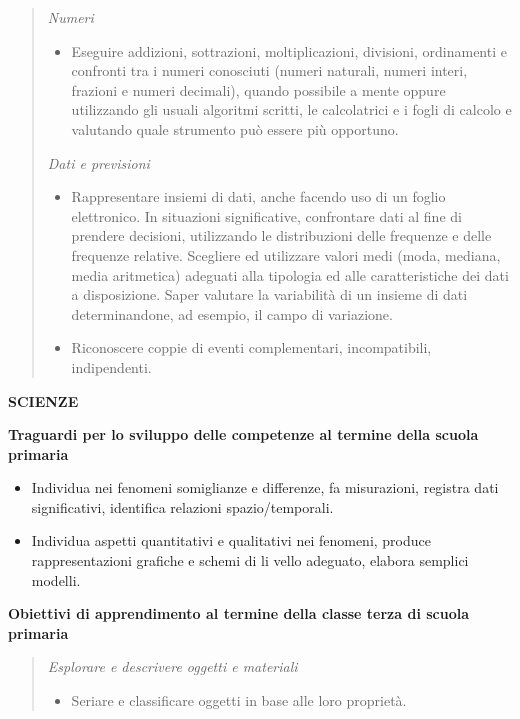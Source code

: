 \documentclass[12pt]{report}
\begin{document}
\begin{quote}
\medskip
\textit{Numeri}

\begin{itemize}
\item Eseguire addizioni, sottrazioni, moltiplicazioni, divisioni, ordinamenti e confronti tra i numeri conosciuti (numeri naturali, numeri interi, frazioni e numeri decimali), quando possibile a mente oppure utilizzando gli usuali algoritmi scritti, le calcolatrici e i fogli di calcolo e valutando quale strumento può essere più opportuno.
\end{itemize}

\medskip
\textit{Dati e previsioni}

\begin{itemize}
\item Rappresentare insiemi di dati, anche facendo uso di un foglio elettronico. In situazioni significative, confrontare dati al fine di prendere decisioni, utilizzando le distribuzioni delle frequenze e delle frequenze relative. Scegliere ed utilizzare valori medi (moda, mediana, media aritmetica) adeguati alla tipologia ed alle caratteristiche dei dati a disposizione. Saper valutare la variabilità di un insieme di dati determinandone, ad esempio, il campo di variazione.

\item Riconoscere coppie di eventi complementari, incompatibili, indipendenti.
\end{itemize}
\end{quote}

\bigskip
\noindent \textbf{SCIENZE}

\medskip
\noindent \textbf{Traguardi per lo sviluppo delle competenze al termine della scuola primaria}

\begin{itemize}
\item Individua nei fenomeni somiglianze e differenze, fa misurazioni, registra dati significativi, identifica relazioni spazio/temporali.

\item Individua aspetti quantitativi e qualitativi nei fenomeni, produce rappresentazioni grafiche e schemi di li vello adeguato, elabora semplici modelli.
\end{itemize}

\medskip
\noindent \textbf{Obiettivi di apprendimento al termine della classe terza di scuola primaria}

\begin{quote}
\medskip
\textit{Esplorare e descrivere oggetti e materiali}

\begin{itemize}
\item Seriare e classificare oggetti in base alle loro proprietà.
\end{itemize}
\end{quote}
\end{document}
